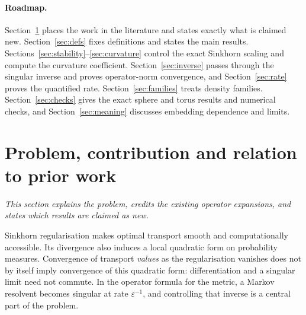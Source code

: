 \documentclass[11pt,a4paper]{article}
\theoremstyle{definition}\newtheorem{definition}[theorem]{Definition}
\theoremstyle{remark}\newtheorem{remark}[theorem]{Remark}
\newcommand{\eps}{\varepsilon}
\begin{document}
\paragraph{Roadmap.} Section~\ref{sec:intro} places the work in the literature and states exactly what is claimed new. Section~\ref{sec:defs} fixes definitions and states the main results. Sections~\ref{sec:stability}--\ref{sec:curvature} control the exact Sinkhorn scaling and compute the curvature coefficient. Section~\ref{sec:inverse} passes through the singular inverse and proves operator-norm convergence, and Section~\ref{sec:rate} proves the quantified rate. Section~\ref{sec:families} treats density families. Section~\ref{sec:checks} gives the exact sphere and torus results and numerical checks, and Section~\ref{sec:meaning} discusses embedding dependence and limits.

\section{Problem, contribution and relation to prior work}\label{sec:intro}

\noindent\emph{This section explains the problem, credits the existing operator expansions, and states which results are claimed as new.}

Sinkhorn regularisation makes optimal transport smooth and computationally accessible. Its divergence also induces a local quadratic form on probability measures. Convergence of transport \emph{values} as the regularisation vanishes does not by itself imply convergence of this quadratic form: differentiation and a singular limit need not commute. In the operator formula for the metric, a Markov resolvent becomes singular at rate $\eps^{-1}$, and controlling that inverse is a central part of the problem.
\end{document}
